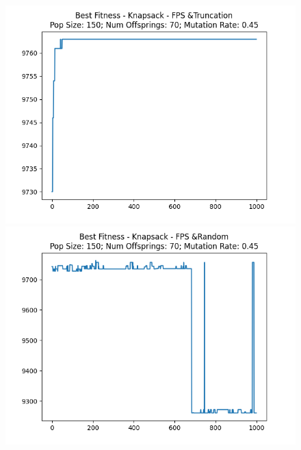 \documentclass[12pt]{report}
\theoremstyle{mytheoremstyle}
\theoremstyle{mytheoremstyle}
\theoremstyle{myproblemstyle}
\begin{document}
\begin{figure}[!]

	\begin{minipage}{0.4\textwidth}
		\includegraphics[width=\linewidth]{../Analysis/BSF_Knapsack_0_3_150_70.png}
	\end{minipage}
	\hspace{\fill}
	\begin{minipage}{0.4\textwidth}
		\includegraphics[width=\linewidth]{../Analysis/BSF_Knapsack_0_4_150_70.png}
	\end{minipage}
	\vspace*{1cm}
	\begin{minipage}{0.4\textwidth}

\end{minipage}
\end{figure}
\end{document}
